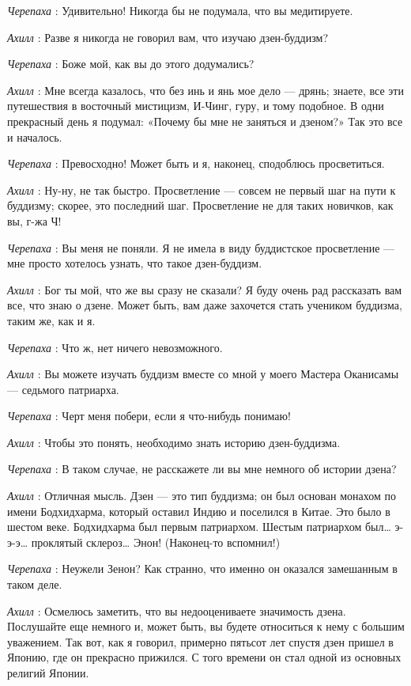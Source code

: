\emph{Черепаха} : Удивительно! Никогда бы не подумала, что вы медитируете.

\emph{Ахилл} : Разве я никогда не говорил вам, что изучаю дзен-буддизм?

\emph{Черепаха} : Боже мой, как вы до этого додумались?

\emph{Ахилл} : Мне всегда казалось, что без инь и янь мое дело --- дрянь; знаете, все эти путешествия в восточный мистицизм, И-Чинг, гуру, и тому подобное. В одни прекрасный день я подумал: «Почему бы мне не заняться и дзеном?» Так это все и началось.

\emph{Черепаха} : Превосходно! Может быть и я, наконец, сподоблюсь просветиться.

\emph{Ахилл} : Ну-ну, не так быстро. Просветление --- совсем не первый шаг на пути к буддизму; скорее, это последний шаг. Просветление не для таких новичков, как вы, г-жа Ч!

\emph{Черепаха} : Вы меня не поняли. Я не имела в виду буддистское просветление --- мне просто хотелось узнать, что такое дзен-буддизм.

\emph{Ахилл} : Бог ты мой, что же вы сразу не сказали? Я буду очень рад рассказать вам все, что знаю о дзене. Может быть, вам даже захочется стать учеником буддизма, таким же, как и я.

\emph{Черепаха} : Что ж, нет ничего невозможного.

\emph{Ахилл} : Вы можете изучать буддизм вместе со мной у моего Мастера Оканисамы --- седьмого патриарха.

\emph{Черепаха} : Черт меня побери, если я что-нибудь понимаю!

\emph{Ахилл} : Чтобы это понять, необходимо знать историю дзен-буддизма.

\emph{Черепаха} : В таком случае, не расскажете ли вы мне немного об истории дзена?

\emph{Ахилл} : Отличная мысль. Дзен --- это тип буддизма; он был основан монахом по имени Бодхидхарма, который оставил Индию и поселился в Китае. Это было в шестом веке. Бодхидхарма был первым патриархом. Шестым патриархом был\ldots{} э-э-э\ldots{} проклятый склероз\ldots{} Энон! (Наконец-то вспомнил!)

\emph{Черепаха} : Неужели Зенон? Как странно, что именно он оказался замешанным в таком деле.

\emph{Ахилл} : Осмелюсь заметить, что вы недооцениваете значимость дзена. Послушайте еще немного и, может быть, вы будете относиться к нему с большим уважением. Так вот, как я говорил, примерно пятьсот лет спустя дзен пришел в Японию, где он прекрасно прижился. С того времени он стал одной из основных религий Японии.

